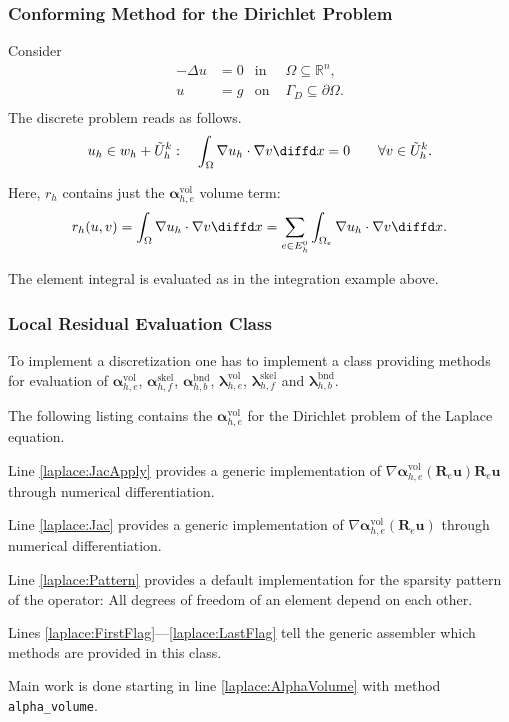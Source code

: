 \begin{frame}
\frametitle<presentation>{Conforming Method for the Dirichlet Problem}
Consider
\begin{subequations}
\begin{align*}
                -\Delta u &= 0& \text{in }& \Omega\subseteq\mathbb{R}^n,\\
                        u &= g& \text{on }& \Gamma_D\subseteq\partial\Omega.\\
\end{align*}
\end{subequations}
The discrete problem reads as follows.
\begin{equation*}
u_h\in w_h+\tilde{U}_h^k : \quad \int_\Omega \nabla u_h \cdot
\nabla v \diffd x = 0 \qquad \forall v\in \tilde{U}^k_h.
\end{equation*}

Here, $r_h$ contains just the $\bm{\alpha}^\text{vol}_{h,e}$ volume term:
\begin{equation*}
r_h(u,v) = \int_\Omega \nabla u_h\cdot\nabla v \diffd x = \sum_{e\in
E_h^0} \int_{\Omega_e} \nabla u_h\cdot\nabla v \diffd x.
\end{equation*}

The element integral is evaluated as in the integration example above.
\end{frame}

\begin{frame}
\frametitle<presentation>{Local Residual Evaluation Class}
To implement a discretization one has to implement a class providing
methods for evaluation of $\bm{\alpha}^\text{vol}_{h,e}$,
$\bm{\alpha}^\text{skel}_{h,f}$, $\bm{\alpha}^\text{bnd}_{h,b}$,
$\bm{\lambda}^\text{vol}_{h,e}$, $\bm{\lambda}^\text{skel}_{h,f}$ and
$\bm{\lambda}^\text{bnd}_{h,b}$.

The following listing contains the $\bm{\alpha}^\text{vol}_{h,e}$ for
the Dirichlet problem of the Laplace equation.

Line \ref{laplace:JacApply} provides a generic implementation of
$\nabla \bm{\alpha}^\text{vol}_{h,e}(\mathbf{R}_e\mathbf{u}) \mathbf{R}_e\mathbf{u}$
through numerical differentiation.

Line \ref{laplace:Jac} provides a generic implementation of
$\nabla \bm{\alpha}^\text{vol}_{h,e}(\mathbf{R}_e\mathbf{u})$ through
numerical differentiation.

Line \ref{laplace:Pattern} provides a default implementation for the
sparsity pattern of the operator: All degrees of freedom of an element
depend on each other.

Lines \ref{laplace:FirstFlag}---\ref{laplace:LastFlag} tell the
generic assembler which methods are provided in this class.

Main work is done starting in line \ref{laplace:AlphaVolume} with
method \lstinline{alpha_volume}.
\end{frame}

